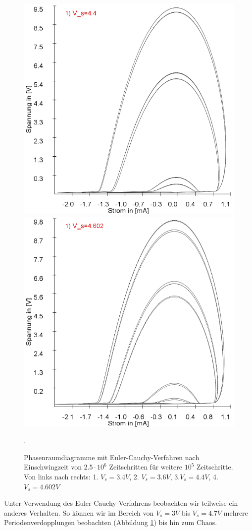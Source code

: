\documentclass[12pt,a4paper]{article}
\begin{document}
\begin{figure}[!htbp]
\includegraphics[scale=0.20]{schwing-euler-nach2500k-weitere100k-4,4V}
\includegraphics[scale=0.20]{schwing-euler-nach2500k-weitere100k-4,602V}
\caption{Phasenraumdiagramme mit Euler-Cauchy-Verfahren nach Einschwingzeit von $2.5\cdot10^6$ Zeitschritten für weitere $10^5$ Zeitschritte. Von links nach rechts: 1. $V_s=3.4V$, 2. $V_s=3.6V$, 3.$V_s=4.4V$, 4.$V_s=4.602V$ }. 
\label{fig:ldr-0005}
\end{figure}
Unter Verwendung des Euler-Cauchy-Verfahrens beobachten wir teilweise ein anderes Verhalten. So können wir im Bereich von $V_s=3V$ bis $V_s=4.7V$ mehrere Periodenverdopplungen beobachten (Abbildung \ref{fig:ldr-0005}) bis hin zum Chaos.
\pagebreak
\end{document}
